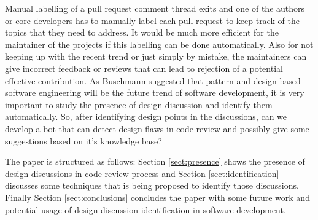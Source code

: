 Manual labelling of a pull request comment thread exits and one of the authors or core developers has to manually label each pull request to keep track of the topics that they need to address. It would be much more efficient for the maintainer of the projects if this labelling can be done automatically. Also for not keeping up with the recent trend or just simply by mistake, the maintainers can give incorrect feedback or reviews that can lead to rejection of a potential effective contribution. As Buschmann \cite{Buschmann2007} suggested that pattern and design based software engineering will be the future trend of software development, it is very important to study the presence of design discussion and identify them automatically. So, after identifying design points in the discussions, can we develop a bot that can detect design flaws in code review and possibly give some suggestions based on it's knowledge base?

The paper is structured as follows: Section \ref{sect:presence} shows the presence of design discussions in code review process and Section \ref{sect:identification} discusses some techniques that is being proposed to identify those discussions. Finally Section \ref{sect:conclusions} concludes the paper with some future work and potential usage of design discussion identification in software development.      


   
